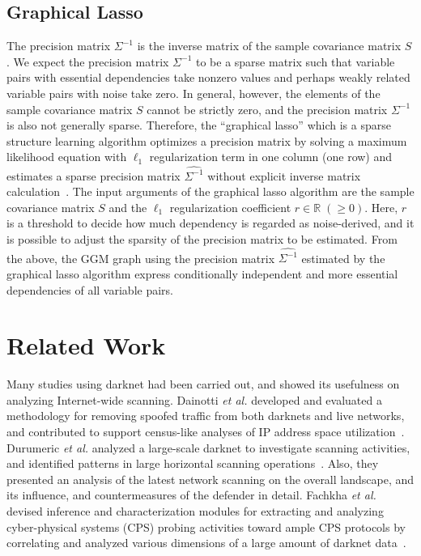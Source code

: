 \documentclass[conference]{IEEEtran}
\begin{document}
\subsection{Graphical Lasso}
The precision matrix $\Sigma^{-1}$ is the inverse matrix of the sample covariance matrix $S$.
We expect the precision matrix $\Sigma^{-1}$ to be a sparse matrix such that variable pairs with essential dependencies take nonzero values and perhaps weakly related variable pairs with noise take zero.
In general, however, the elements of the sample covariance matrix $S$ cannot be strictly zero, and the precision matrix $\Sigma^{-1}$ is also not generally sparse.
Therefore, the ``graphical lasso'' which is a sparse structure learning algorithm optimizes a precision matrix by solving a maximum likelihood equation with $\ell_1$ regularization term in one column (one row) and estimates a sparse precision matrix $\hat{\Sigma^{-1}}$ without explicit inverse matrix calculation~\cite{Friedman}.
The input arguments of the graphical lasso algorithm are the sample covariance matrix $S$ and the $\ell_1$ regularization coefficient $r\in\mathbb{R}\;(\geq 0)$.
Here, $r$ is a threshold to decide how much dependency is regarded as noise-derived, and it is possible to adjust the sparsity of the precision matrix to be estimated.
From the above, the GGM graph using the precision matrix $\hat{\Sigma^{-1}}$ estimated by the graphical lasso algorithm express conditionally independent and more essential dependencies of all variable pairs.



\section{Related Work}
Many studies using darknet had been carried out, and showed its usefulness on analyzing Internet-wide scanning.
Dainotti {\it et al.} developed and evaluated a methodology for removing spoofed traffic from both darknets and live networks, and contributed to support census-like analyses of IP address space utilization~\cite{Dainotti}.
Durumeric {\it et al.} analyzed a large-scale darknet to investigate scanning activities, and identified patterns in large horizontal scanning operations~\cite{Durumeric}.
Also, they presented an analysis of the latest network scanning on the overall landscape, and its influence, and countermeasures of the defender in detail.
Fachkha {\it et al.} devised inference and characterization modules for extracting and analyzing cyber-physical systems (CPS) probing activities toward ample CPS protocols by correlating and analyzed various dimensions of a large amount of darknet data~\cite{Fachkha}.
\end{document}
